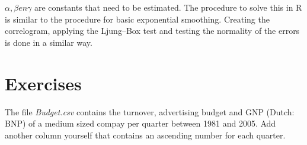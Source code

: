 $\alpha, \beta en \gamma$ are constants that need to be estimated.
The procedure to solve this in R is similar to the procedure for basic exponential smoothing. Creating the correlogram, applying the Ljung–Box test and testing the normality of the errors is done in a similar way.

\section{Exercises}
\label{sec:time-series-exercises}

\begin{exercise}
  The file \emph{Budget.csv} contains the turnover, advertising budget and GNP (Dutch: BNP) of a medium sized compay per quarter between 1981 and 2005. Add another column yourself that contains an ascending number for each quarter.
  

\end{exercise}
